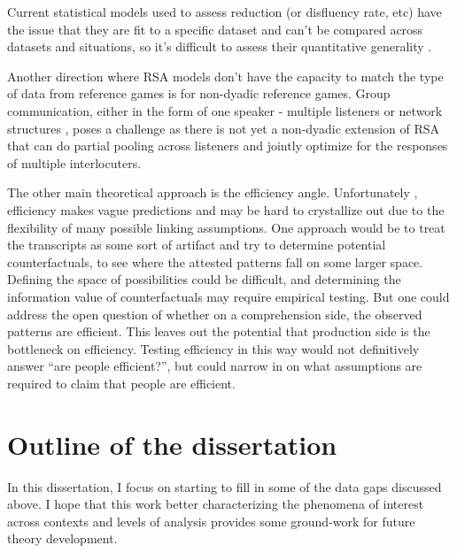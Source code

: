 \documentclass[]{article}
\begin{document}
	Current statistical models used to assess reduction (or disfluency rate, etc) have the issue that they are fit to a specific dataset and can't be compared across datasets and situations, so it's difficult to assess their quantitative generality \citep{yarkoni2017}. 
	
	
	Another direction where RSA models don't have the capacity to match the type of data from reference games is for non-dyadic reference games. Group communication, either in the form of one speaker - multiple listeners \citep{yoon2014, yoon2018, yoon2019} or network structures \citep{hawkins2021a}, poses a challenge as there is not yet a non-dyadic extension of RSA that can do partial pooling across listeners and jointly optimize for the responses of multiple interlocuters. 
	
	The other main theoretical approach is the efficiency angle. Unfortunately , efficiency makes vague predictions and may be hard to crystallize out due to the flexibility of many possible linking assumptions. One approach would be to treat the transcripts as some sort of artifact and try to determine potential counterfactuals, to see where the attested patterns fall on some larger space. Defining the space of possibilities could be difficult, and determining the information value of counterfactuals may require empirical testing. But one could address the open question of whether on a comprehension side, the observed patterns are efficient. This leaves out the potential that production side is the bottleneck on efficiency. Testing efficiency in this way would not definitively answer ``are people efficient?'', but could narrow in on what assumptions are required to claim that people are efficient. 
	
	
	\section{Outline of the dissertation}
	

	In this dissertation, I focus on starting to fill in some of the data gaps discussed above. I hope that this work better characterizing the phenomena of interest across contexts and levels of analysis provides some ground-work for future theory development. 
\end{document}
